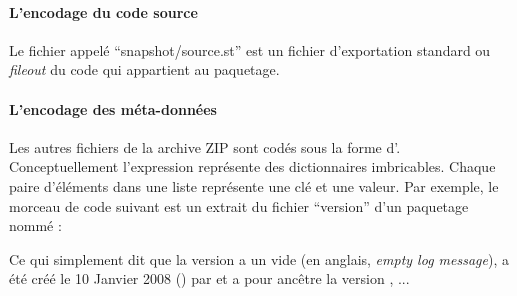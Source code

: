 \documentclass[a4paper,10pt,twoside]{book}
\begin{document}
\paragraph{L'encodage du code source}%

Le fichier appelé ``snapshot/source.st'' est un fichier d'exportation standard
ou \emph{fileout} du code qui appartient au paquetage.

\paragraph{L'encodage des méta-données}

Les autres fichiers de la archive ZIP sont codés sous la forme
d'.
Conceptuellement l'expression représente des dictionnaires
imbricables. Chaque paire d'éléments dans une liste représente une clé
et une valeur. Par exemple, le morceau de code suivant est un extrait
du fichier ``version'' d'un paquetage nommé :


Ce qui simplement dit que la version  a un  vide (en anglais, \emph{empty log message}), a été
créé le 10 Janvier 2008 () par  et a pour
ancêtre la version , ...




\end{document}
